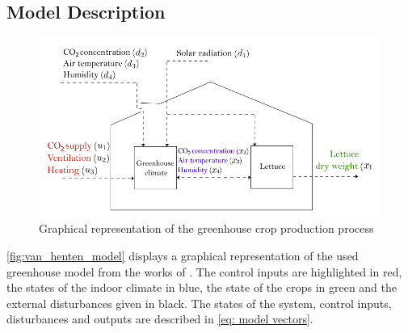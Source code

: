 \subsection{Model Description}
\begin{figure}[H]
	\centering
	\includegraphics[width = 0.75\linewidth]{figures/van_henten_model.png}
	\caption{Graphical representation of the greenhouse crop production process \cite{hentenGreenhouseClimateManagement1994}}
	\label{fig:van_henten_model}
\end{figure}

\autoref{fig:van_henten_model} displays a graphical representation of the used greenhouse model from the works of \cite{hentenGreenhouseClimateManagement1994}. The control inputs are highlighted in red, the states of the indoor climate in blue, the state of the crops in green and the external disturbances given in black. The states of the system, control inputs, disturbances and outputs are described in \autoref{eq: model vectors}.

